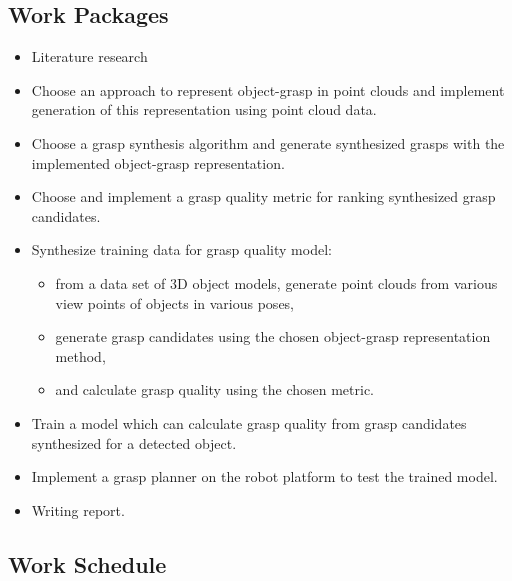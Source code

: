 \documentclass[12pt]{article}
\begin{document}
    \subsection{Work Packages}
    \begin{itemize}
    	\item Literature research
    	\item Choose an approach to represent object-grasp in point clouds and implement generation of this representation using point cloud data.
    	\item Choose a grasp synthesis algorithm and generate synthesized grasps with the implemented object-grasp representation.
    	\item Choose and implement a grasp quality metric for ranking synthesized grasp candidates.
    	\item Synthesize training data for grasp quality model:
    	\begin{itemize}
    		\item from a data set of 3D object models, generate point clouds from various view points of objects in various poses,
    		\item generate grasp candidates using the chosen object-grasp representation method,
    		\item and calculate grasp quality using the chosen metric.
    	\end{itemize}
    	\item Train a model which can calculate grasp quality from grasp candidates synthesized for a detected object.
    	\item Implement a grasp planner on the robot platform to test the trained model.
    	\item Writing report.
    \end{itemize}

    \subsection{Work Schedule}    
    

\printbibliography

\end{document}
